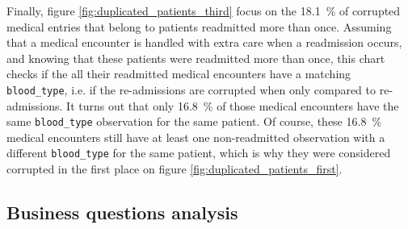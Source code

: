 \documentclass[a4paper,11pt]{article}
\newcommand{\bloodType}{\texttt{blood\_type}\xspace}
\begin{document}
Finally, figure \ref{fig:duplicated_patients_third} focus on the \SI{18.1}{\percent} of corrupted medical entries that belong to patients readmitted more than once. 
Assuming that a medical encounter is handled with extra care when a readmission occurs, and knowing that these patients were readmitted more than once, this chart checks if the all their readmitted medical encounters have a matching \bloodType, i.e. if the re-admissions are corrupted when only compared to re-admissions.
It turns out that only \SI{16.8}{\percent} of those medical encounters have the same \bloodType observation for the same patient. 
Of course, these \SI{16.8}{\percent} medical encounters still have at least one non-readmitted observation with a different \bloodType for the same patient, which is why they were considered corrupted in the first place on figure \ref{fig:duplicated_patients_first}.






\subsection{Business questions analysis}




\end{document}
